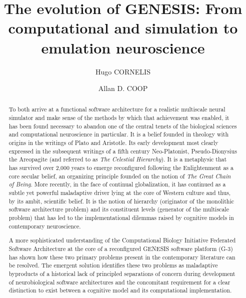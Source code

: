 \documentclass[11pt,3p,twocolumn]{JMN}
\begin{document}
\pagestyle{fancy}
\fancyhf{}
\rfoot{\thepage}

\begin{frontmatter}

\title{The evolution of GENESIS: From computational and simulation to emulation neuroscience}

\author[a,1]{Hugo CORNELIS} 
\author[b]{Allan D. COOP} 

\address[a]{\noindent Neurospaces Development, Daniëlstraat 27, 3500 Hasselt, BELGIUM}

\address[b]{Three Way Street, PO Box 140, Grenfell, 2801 NSW, AUSTRALIA\vspace{0.5cm}}

\address[1]{Corresponding author: {\bf hugo.cornelis@google.com}}

\begin{abstract}
To both arrive at a functional software architecture for a realistic multiscale neural simulator and make sense of the methods by which that achievement was enabled, it has been found necessary to abandon one of the central tenets of the biological sciences and computational neuroscience in particular. It is a belief founded in theology with origins in the writings of Plato and Aristotle. Its early development most clearly expressed in the subsequent writings of a fifth century Neo-Platonist, Pseudo-Dionysius the Areopagite (and referred to as {\it{The Celestial Hierarchy}}). It is a metaphysic that has survived over 2,000 years to emerge reconfigured following the Enlightenment as a core secular belief, an organizing principle founded on the notion of {\it{The Great Chain of Being}}. More recently, in the face of continual globalization, it has continued as a subtle yet powerful maladaptive driver lying at the core of Western culture and thus, by its ambit, scientific belief. It is the notion of hierarchy (originator of the monolithic software architecture problem) and its constituent levels (generator of the multiscale problem) that has led to the implementational dilemmas raised by cognitive models in contemporary neuroscience.

A more sophisticated understanding of the Computational Biology Initiative Federated Software Architecture at the core of a reconfigured GENESIS software platform (G-3) has shown how these two primary problems present in the contemporary literature can be resolved. The emergent solution identifies these two problems as maladaptive byproducts of a historical lack of principled separations of concern during development of neurobiological software architectures and the concomitant requirement for a clear distinction to exist between a cognitive model and its computational implementation.


\end{abstract}
\end{frontmatter}
\end{document}
